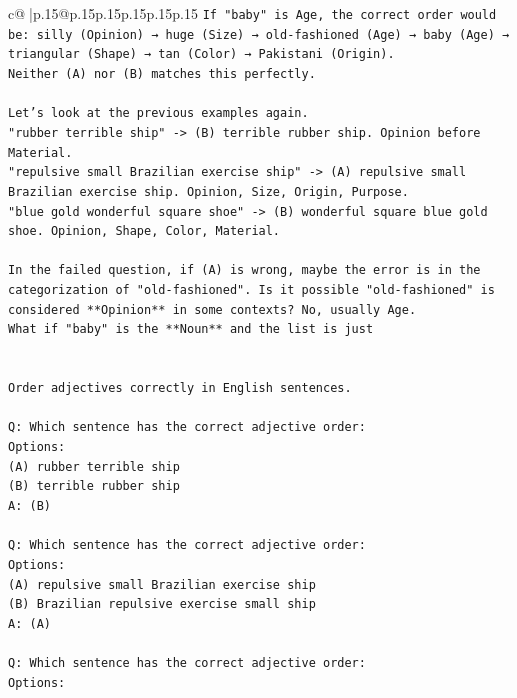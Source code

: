 \documentclass{article}
\begin{document}
{\begin{supertabular}{c@{$\;$}|p{.15\linewidth}@{}p{.15\linewidth}p{.15\linewidth}p{.15\linewidth}p{.15\linewidth}p{.15\linewidth}}
{{{\texttt{If "baby" is Age, the correct order would be: silly (Opinion) → huge (Size) → old{-}fashioned (Age) → baby (Age) → triangular (Shape) → tan (Color) → Pakistani (Origin).} \\
\texttt{Neither (A) nor (B) matches this perfectly.} \\
\\ 
\texttt{Let's look at the previous examples again.} \\
\texttt{"rubber terrible ship" {-}> (B) terrible rubber ship. Opinion before Material.} \\
\texttt{"repulsive small Brazilian exercise ship" {-}> (A) repulsive small Brazilian exercise ship. Opinion, Size, Origin, Purpose.} \\
\texttt{"blue gold wonderful square shoe" {-}> (B) wonderful square blue gold shoe. Opinion, Shape, Color, Material.} \\
\\ 
\texttt{In the failed question, if (A) is wrong, maybe the error is in the categorization of "old{-}fashioned". Is it possible "old{-}fashioned" is considered **Opinion** in some contexts? No, usually Age.} \\
\texttt{What if "baby" is the **Noun** and the list is just} \\
\\ 
\\ 
\texttt{Order adjectives correctly in English sentences.} \\
\\ 
\texttt{Q: Which sentence has the correct adjective order:} \\
\texttt{Options:} \\
\texttt{(A) rubber terrible ship} \\
\texttt{(B) terrible rubber ship} \\
\texttt{A: (B)} \\
\\ 
\texttt{Q: Which sentence has the correct adjective order:} \\
\texttt{Options:} \\
\texttt{(A) repulsive small Brazilian exercise ship} \\
\texttt{(B) Brazilian repulsive exercise small ship} \\
\texttt{A: (A)} \\
\\ 
\texttt{Q: Which sentence has the correct adjective order:} \\
\texttt{Options:} \\
}}}
\end{supertabular}}
\end{document}
